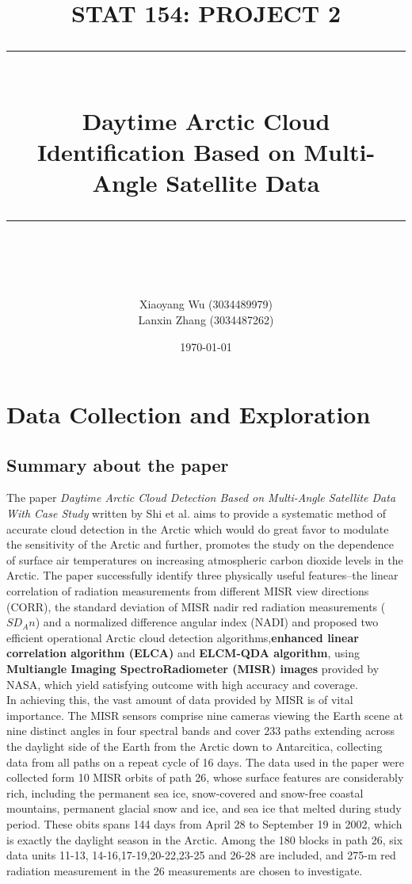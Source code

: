 \documentclass[11pt]{scrartcl} %
\title{	
	\normalfont\normalsize
	\textsc{STAT 154: PROJECT 2}\\ %
	\vspace{25pt} %
	\rule{\linewidth}{0.5pt}\\ %
	\vspace{20pt} %
	{\huge Daytime Arctic Cloud Identification Based on Multi-Angle Satellite Data\footnotemark[1]}\\ %
	\vspace{12pt} %
	\rule{\linewidth}{2pt}\\ %
	\vspace{12pt} %
}
\author{Xiaoyang Wu (3034489979)  \\  Lanxin Zhang (3034487262)} %
\date{\normalsize\today} %
\begin{document}
\maketitle %

{\renewcommand{\thefootnote}{\*{*}}
}

\section{Data Collection and Exploration}
\subsection{Summary about the paper}

The paper \textit{Daytime Arctic Cloud Detection Based on Multi-Angle Satellite Data With Case Study} written by Shi et al. aims to provide a systematic method of accurate cloud detection in the Arctic which would do great favor to modulate the sensitivity of the Arctic and further, promotes the study on the dependence of surface air temperatures on increasing atmospheric carbon dioxide levels in the Arctic. The paper successfully identify three physically useful features--the linear correlation of radiation measurements from different MISR view directions (CORR), the standard deviation of MISR nadir red radiation measurements ($SD_An$) and a normalized difference angular index (NADI) and proposed two efficient operational Arctic cloud detection algorithms,\textbf{enhanced linear correlation algorithm (ELCA)} and \textbf{ELCM-QDA algorithm}, using \textbf{Multiangle Imaging SpectroRadiometer (MISR) images} provided by NASA, which yield satisfying outcome with high accuracy and coverage.\\

In achieving this, the vast amount of data provided by MISR is of vital importance. The MISR sensors comprise nine cameras viewing the Earth scene at nine distinct angles in four spectral bands and cover 233 paths extending across the daylight side of the Earth from the Arctic down to Antarcitica, collecting data from all paths on a repeat cycle of 16 days. The data used in the paper were collected form 10 MISR orbits of path 26, whose surface features are considerably rich, including the permanent sea ice, snow-covered and snow-free coastal mountains, permanent glacial snow and ice, and sea ice that melted during study period. These obits spans 144 days from April 28 to September 19 in 2002, which is exactly the daylight season in the Arctic. Among the 180 blocks in path 26, six data units 11-13, 14-16,17-19,20-22,23-25 and 26-28 are included, and 275-m red radiation measurement in the 26 measurements are chosen to investigate.\\
\end{document}
